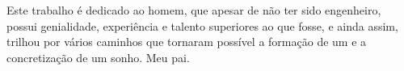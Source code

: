 Este trabalho é dedicado ao homem, que apesar de não ter sido engenheiro, possui genialidade, experiência e talento superiores ao que fosse, e ainda assim, trilhou por vários caminhos que tornaram possível a formação de um e a concretização de um sonho. Meu pai.